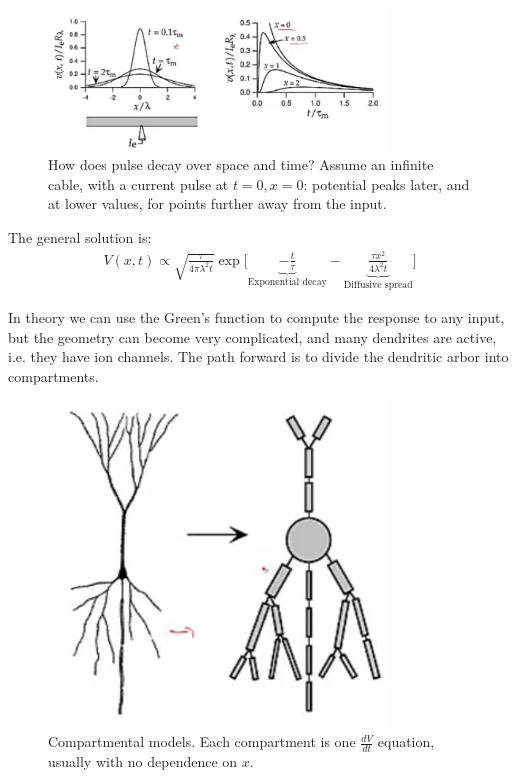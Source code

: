 \documentclass[]{article}
\begin{document}
\begin{figure}[H]
	\caption[How does pulse decay over space and time?]{How does pulse decay over space and time? Assume an infinite cable, with a current pulse at $t=0, x=0$: potential peaks later, and at lower values, for points further away from the input.}
	\includegraphics[width=0.8\textwidth]{voltage-decay-space-time}
\end{figure}

The general solution is:
\begin{align*}
	V(x,t) \propto \sqrt{\frac{\tau}{4 \pi \lambda^2 t}} \exp \big[\underbrace{-\frac{t}{\tau}}_\text{Exponential decay} -\underbrace{\frac{\tau x^2}{4 \lambda^2 t}}_\text{Diffusive spread}\big]
\end{align*}

In theory we can use the Green's function to compute the response to any input, but the geometry can become very complicated, and many dendrites are active, i.e. they have ion channels. The path forward is to divide the dendritic arbor into compartments.

\begin{figure}[H]
	\caption[Compartmental models.]{Compartmental models. Each compartment is one $\frac{dV}{dt}$ equation, usually with no dependence on $x$.}
	\includegraphics[width=0.8\textwidth]{compartmental-models}
\end{figure}
\end{document}
